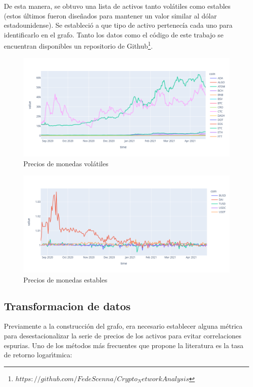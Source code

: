 \documentclass[runningheads,a4paper,10pt]{etc/llncs}
\begin{document}
De esta manera, se obtuvo una lista de activos tanto volátiles como estables (estos últimos fueron diseñados para mantener un valor similar al dólar estadounidense). Se estableció a que tipo de activo pertenecía cada uno para identificarlo en el grafo.
Tanto los datos como el código de este trabajo se encuentran disponibles un repositorio de Github\footnote{$https://github.com/FedeScenna/Crypto_NetworkAnalysis$}.

\begin{figure}[htp]
    \centering
    \includegraphics[scale=0.3]{images/volatilecoins_lineplot.png}
    \caption{Precios de monedas volátiles}
    \label{fig:stablecoins}
\end{figure}

\begin{figure}[htp]
    \centering
    \includegraphics[scale=0.3]{images/stablecoins_lineplot.png}
    \caption{Precios de monedas estables}
    \label{fig:stablecoins}
\end{figure}


\subsection{Transformacion de datos}
Previamente a la construcción del grafo, era necesario establecer alguna
métrica para desestacionalizar la serie de precios de los activos para evitar correlaciones espurias. Uno de los métodos más frecuentes que propone la literatura \cite{cryptonetwork} es la tasa de retorno logarı́tmica:
\end{document}
